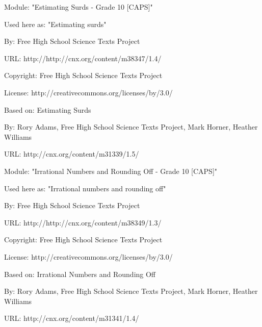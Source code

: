       \par\vspace{9pt}\noindent\begin{minipage}{\textwidth}
      Module: "Estimating Surds - Grade 10 [CAPS]" \par\nopagebreak\noindent
      Used here as: "Estimating surds" \par\nopagebreak\noindent
        By: Free High School Science Texts Project\par\nopagebreak\noindent
      URL: http://http://cnx.org/content/m38347/1.4/\par\nopagebreak\noindent
      \par\nopagebreak\noindent
      Copyright: Free High School Science Texts Project\par\nopagebreak\noindent
      License:  http://creativecommons.org/licenses/by/3.0/\par\nopagebreak\noindent
      Based on: Estimating Surds\par\nopagebreak\noindent
        By: Rory Adams, Free High School Science Texts Project, Mark Horner, Heather Williams\par\nopagebreak\noindent
        URL: http://cnx.org/content/m31339/1.5/
        \par\end{minipage}
      \par\vspace{9pt}\noindent\begin{minipage}{\textwidth}
      Module: "Irrational Numbers and Rounding Off - Grade 10 [CAPS]" \par\nopagebreak\noindent
      Used here as: "Irrational numbers and rounding off" \par\nopagebreak\noindent
        By: Free High School Science Texts Project\par\nopagebreak\noindent
      URL: http://http://cnx.org/content/m38349/1.3/\par\nopagebreak\noindent
      \par\nopagebreak\noindent
      Copyright: Free High School Science Texts Project\par\nopagebreak\noindent
      License:  http://creativecommons.org/licenses/by/3.0/\par\nopagebreak\noindent
      Based on: Irrational Numbers and Rounding Off\par\nopagebreak\noindent
        By: Rory Adams, Free High School Science Texts Project, Mark Horner, Heather Williams\par\nopagebreak\noindent
        URL: http://cnx.org/content/m31341/1.4/
        \par\end{minipage}
